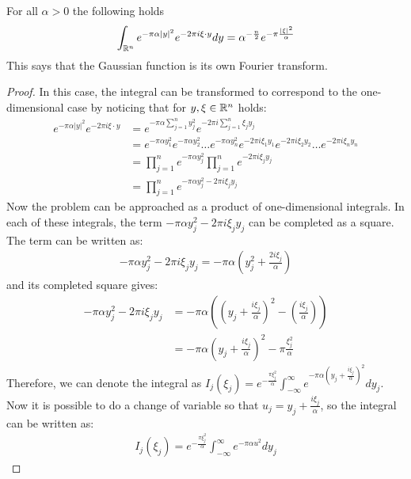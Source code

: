 \begin{theorem}\label{thm:fourier-gaussian}
    For all $\alpha>0$ the following holds
    \begin{equation*}
        \int_{\mathbb R^n}e^{-\pi\alpha|y|^2}e^{-2\pi i\xi\cdot y}dy=\alpha^{-\frac{n}{2}}e^{-\pi\frac{|\xi|^2}{\alpha}}
    \end{equation*}
    This says that the Gaussian function is its own Fourier transform.
\end{theorem}
\begin{proof}
    In this case, the integral can be transformed to correspond to the one-dimensional case by noticing that for $y,\xi\in\mathbb R^n$ holds:
    \begin{align*}
        e^{-\pi\alpha|y|^2}e^{-2\pi i\xi\cdot y}&=e^{-\pi\alpha\sum_{j=1}^ny_j^2}e^{-2\pi i\sum_{j=1}^n\xi_jy_j} \\
        &=e^{-\pi\alpha y_1^2}e^{-\pi\alpha y_2^2}\ldots e^{-\pi\alpha y_n^2}e^{-2\pi i\xi_1y_1}e^{-2\pi i\xi_2y_2}\ldots e^{-2\pi i\xi_ny_n}\\
        &=\prod_{j=1}^ne^{-\pi\alpha y_j^2}\prod_{j=1}^ne^{-2\pi i\xi_jy_j} \\
        &=\prod_{j=1}^ne^{-\pi\alpha y_j^2-2\pi i\xi_jy_j}
    \end{align*}
    Now the problem can be approached as a product of one-dimensional integrals. In each of these integrals, the term $-\pi\alpha y_j^2-2\pi i\xi_jy_j$ can be completed as a square. The term can be written as:
    \begin{gather*}
        -\pi\alpha y_j^2-2\pi i\xi_jy_j=-\pi\alpha\left(y_j^2+\frac{2i\xi_j}{\alpha} \right)
    \end{gather*}
    and its completed square gives:
    \begin{align*}
        -\pi\alpha y_j^2-2\pi i\xi_jy_j&=-\pi\alpha\left(\left(y_j+\frac{i\xi_j}{\alpha}\right)^2-\left(\frac{i\xi_j}{\alpha}\right)\right) \\
        &=-\pi\alpha\left(y_j+\frac{i\xi_j}{\alpha}\right)^2-\pi\frac{\xi_j^2}{\alpha}
    \end{align*}
    Therefore, we can denote the integral as $I_j(\xi_j)=e^{-\frac{\pi \xi_j^2}{\alpha}}\int_{-\infty}^\infty e^{-\pi\alpha\left(y_j+\frac{i\xi_j}{\alpha}\right)^2}dy_j$. Now it is possible to do a change of variable so that $u_j=y_j+\frac{i\xi_j}{\alpha}$, so the integral can be written as:
    \begin{gather*}
        I_j(\xi_j)=e^{-\frac{\pi \xi_j^2}{\alpha}}\int_{-\infty}^\infty e^{-\pi\alpha u^2}dy_j

\end{gather*}
\end{proof}
